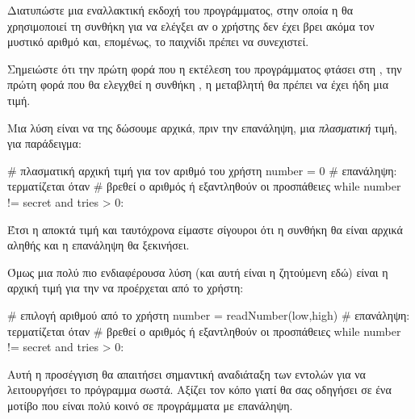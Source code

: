 \documentclass[a4paper,11pt,oneside]{book}
\begin{document}
\begin{exercise}
\label{exercise:while-condition}
Διατυπώστε μια εναλλακτική εκδοχή του προγράμματος, στην οποία η  θα χρησιμοποιεί τη συνθήκη  για να ελέγξει αν ο χρήστης δεν έχει βρει ακόμα τον μυστικό αριθμό και, επομένως, το παιχνίδι πρέπει να συνεχιστεί.

\begin{note}
Σημειώστε ότι την πρώτη φορά που η εκτέλεση του προγράμματος φτάσει στη , την πρώτη φορά που θα ελεγχθεί η συνθήκη , η μεταβλητή  θα πρέπει να έχει ήδη μια τιμή.

Μια λύση είναι να της δώσουμε αρχικά, πριν την επανάληψη, μια \emph{πλασματική} τιμή, για παράδειγμα:

\begin{pyplain}
# πλασματική αρχική τιμή για τον αριθμό του χρήστη
number = 0
# επανάληψη: τερματίζεται όταν
# βρεθεί ο αριθμός ή εξαντληθούν οι προσπάθειες
while number != secret and tries > 0:
\end{pyplain}

Έτσι η  αποκτά τιμή και ταυτόχρονα είμαστε σίγουροι ότι η συνθήκη  θα είναι αρχικά αληθής και η επανάληψη θα ξεκινήσει. 

Όμως μια πολύ πιο ενδιαφέρουσα λύση (και αυτή είναι η ζητούμενη εδώ) είναι η αρχική τιμή για την  %
να προέρχεται από το χρήστη:

\begin{pyplain}
# επιλογή αριθμού από το χρήστη
number = readNumber(low,high)
# επανάληψη: τερματίζεται όταν
# βρεθεί ο αριθμός ή εξαντληθούν οι προσπάθειες
while number != secret and tries > 0:
\end{pyplain}

Αυτή η προσέγγιση θα απαιτήσει σημαντική αναδιάταξη των εντολών για να λειτουργήσει το πρόγραμμα σωστά. Αξίζει τον κόπο γιατί θα σας οδηγήσει σε ένα μοτίβο που είναι πολύ κοινό σε προγράμματα με επανάληψη.
\end{note}
\end{exercise}
\end{document}
